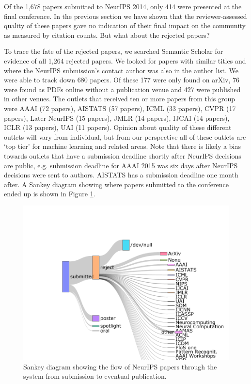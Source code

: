 \documentclass[twoside]{article}
\begin{document}
Of the 1,678 papers submitted to NeurIPS 2014, only 414 were presented at the final conference. In the previous section we have shown that the reviewer-assessed quality of these papers gave no indication of their final impact on the community as measured by citation counts. But what about the rejected papers?

To trace the fate of the rejected papers, we searched Semantic Scholar for evidence of all 1,264 rejected papers. We looked for papers with similar titles and where the NeurIPS submission's contact author was also in the author list. We were able to track down 680 papers. Of these 177 were only found on arXiv, 76 were found as PDFs online without a publication venue and 427 were published in other venues. The outlets that received ten or more papers from this group were AAAI (72 papers), AISTATS (57 papers), ICML (33 papers), CVPR (17 papers), Later NeurIPS (15 papers), JMLR (14 papers), IJCAI (14 papers), ICLR (13 papers), UAI (11 papers).  
Opinion about quality of these different outlets will vary from individual, but from our perspective all of these outlets are `top tier' for machine learning and related areas. Note that there is likely a bias towards outlets that have a submission deadline shortly after NeurIPS decisions are public, e.g. submission deadline for AAAI 2015 was six days after NeurIPS decisions were sent to authors. AISTATS has a submission deadline one month after. A Sankey diagram showing where papers submitted to the conference ended up is shown in Figure \ref{figure-where-do-neurips-papers-go}.

\begin{figure}[htb]
\includegraphics[width=0.9\columnwidth]{diagrams/neurips/where-do-neurips-papers-go.pdf}

\caption{Sankey diagram showing the flow of NeurIPS papers through the system from submission to eventual publication.}
\label{figure-where-do-neurips-papers-go}
\end{figure}
\end{document}
